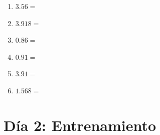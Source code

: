 \documentclass[12pt]{article}
\begin{document}
\begin{enumerate}
\item \large $ 3.56 = $ \vspace{1.5cm}
\item \large $ 3.918 = $ \vspace{1.5cm}
\item \large $ 0.86 = $ \vspace{1.5cm}
\item \large $ 0.91 = $ \vspace{1.5cm}
\item \large $ 3.91 = $ \vspace{1.5cm}
\item \large $ 1.568 = $ \vspace{1.5cm}
\end{enumerate}\newpage
\section*{Día 2: Entrenamiento}
\end{document}
